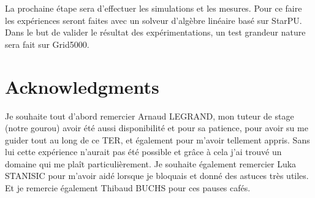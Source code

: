 \documentclass[smallextended]{svjour3}
\begin{document}
La prochaine étape sera d'effectuer les simulations et les mesures. 
Pour ce faire les expériences seront faites avec un solveur d'algèbre 
linéaire basé sur StarPU. Dans le but de valider le résultat des 
expérimentations, un test grandeur nature sera fait sur Grid5000.  

\section*{Acknowledgments}
Je souhaite tout d'abord remercier Arnaud LEGRAND, mon tuteur de stage
(notre gourou) avoir été aussi disponibilité et pour sa patience, pour
avoir su me guider tout au long de ce TER, et également pour m'avoir
tellement appris. Sans lui cette expérience n'aurait pas été possible
et grâce à cela j'ai trouvé un domaine qui me plaît particulièrement.
Je souhaite également remercier Luka STANISIC pour m'avoir aidé
lorsque je bloquais et donné des astuces très utiles.
Et je remercie également Thibaud BUCHS pour ces pauses cafés.
\nocite{*}
\def\raggedright{}


\end{document}
